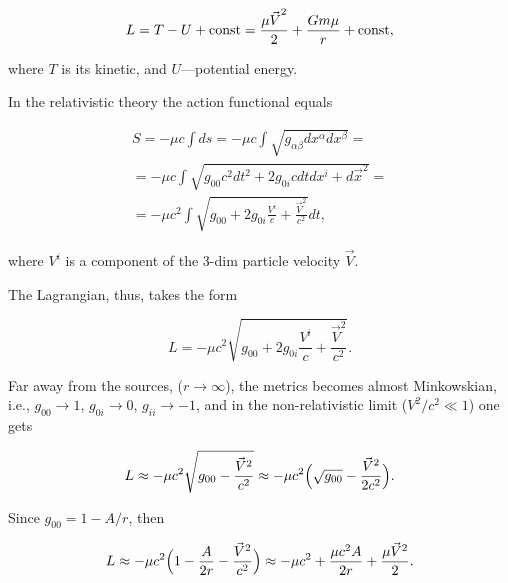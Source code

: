 \begin{equation}

\label{class_lag} 

L=T-U+{\rm const}=\frac{{\mu \vec V}^2}{2} +\frac{Gm\mu}{r} +{\rm const},

\end{equation}

where $T$ is its kinetic, and $U$---potential energy. 

In the relativistic theory the action functional equals 

\begin{multline}

\label{rel_act}

S = -\mu c \int ds = -\mu c \int \sqrt{g_{\alpha \beta}dx^\alpha dx^\beta} = \\

    = -\mu c \int \sqrt{g_{00}c^2dt^2+2g_{0i}cdtdx^i+{d\vec x}^2} =\\

    = -\mu c^2 \int \sqrt{g_{00}+2g_{0i}\frac{V^i}{c}+\frac{{\vec V}^2}{c^2}}dt,

\end{multline}

where $V^i$ is a component of the 3-dim particle velocity $\vec V$. 

The Lagrangian, thus, takes the form

\begin{equation}

\label{rel_lag}

L=-\mu c^2 \sqrt{g_{00}+2g_{0i}\frac{V^i}{c}+\frac{{\vec V}^2}{c^2}}.

\end{equation}

Far away from the sources, ($r \to \infty$), the metrics becomes almost Minkowskian, i.e., $g_{00} \to 1$, $g_{0i} \to 0$, $g_{ii} \to -1$, and in the non-relativistic limit (${V^2}/{c^2} \ll 1$) one gets

\begin{equation}

\label{approx_lag}

L \approx -\mu c^2 \sqrt{g_{00}-\frac{{\vec V}^2}{c^2}}

 \approx -\mu c^2 \Bigl(\sqrt{g_{00}} - \frac{{\vec V}^2}{2c^2}\Bigr).

\end{equation}

Since $g_{00}=1-{A}/{r}$, then

\begin{equation}

\label{approx_lag1}

L \approx -\mu c^2 \Bigl(1-\frac{A}{2r}-\frac{{\vec V}^2}{c^2}\Bigr)

 \approx -\mu c^2  +\frac{\mu c^2 A}{2r}+ \frac{\mu{\vec V}^2}{2}.

\end{equation}

